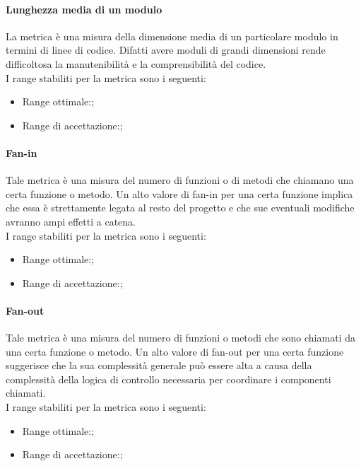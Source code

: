 			\paragraph{Lunghezza media di un modulo}
			La metrica è una misura della dimensione media di un particolare modulo in termini di linee di codice. Difatti avere moduli di grandi dimensioni rende difficoltosa la manutenibilità e la comprensibilità del codice.
			\\I range stabiliti per la metrica sono i seguenti:
			\begin{itemize}
				\item Range ottimale:;
				\item Range di accettazione:;
			\end{itemize}
			
			\paragraph{Fan-in}
			Tale metrica è una misura del numero di funzioni o di metodi che chiamano una certa funzione o metodo.
			Un alto valore di fan-in per una certa funzione implica che essa è strettamente legata al resto del progetto e che sue eventuali modifiche avranno ampi effetti a catena.
			\\I range stabiliti per la metrica sono i seguenti:
			\begin{itemize}
				\item Range ottimale:;
				\item Range di accettazione:;
			\end{itemize}
			
			\paragraph{Fan-out}
			Tale metrica è una misura del numero di funzioni o metodi che sono chiamati da una certa funzione o metodo. Un alto valore di fan-out per una certa funzione suggerisce che la sua complessità generale può essere alta a causa della complessità della logica di controllo necessaria per coordinare i componenti chiamati.
			\\I range stabiliti per la metrica sono i seguenti:
			\begin{itemize}
				\item Range ottimale:;
				\item Range di accettazione:;
			\end{itemize}
			

